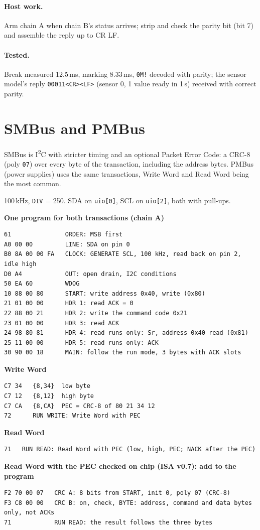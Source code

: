 \documentclass[11pt,a4paper]{article}
\newcommand{\sig}[1]{\texttt{#1}}
\newcommand{\progtitle}[1]{\par\smallskip\textbf{\small\color{accent}#1}\par\nopagebreak}
\newcommand{\facts}[1]{\par\noindent\colorbox{codebg}{\parbox{\dimexpr\linewidth-2\fboxsep}{\small #1}}\par}
\begin{document}
\paragraph{Host work.} Arm chain A when chain B's status arrives; strip and check the parity bit (bit 7) and assemble the reply up to CR LF.

\paragraph{Tested.} Break measured 12.5\,ms, marking 8.33\,ms, \texttt{0M!} decoded with parity; the sensor model's reply \texttt{00011<CR><LF>} (sensor 0, 1 value ready in 1\,s) received with correct parity.
\section{SMBus and PMBus}
SMBus is I\textsuperscript{2}C with stricter timing and an optional Packet Error Code: a CRC-8 (poly \texttt{07}) over every byte of the transaction, including the address bytes. PMBus (power supplies) uses the same transactions, Write Word and Read Word being the most common.
\facts{100\,kHz, \sig{DIV} = 250. SDA on \sig{uio[0]}, SCL on \sig{uio[2]}, both with pull-ups.}
\progtitle{One program for both transactions (chain A)}
\begin{lstlisting}
61               ORDER: MSB first
A0 00 00         LINE: SDA on pin 0
B0 8A 00 00 FA   CLOCK: GENERATE SCL, 100 kHz, read back on pin 2, idle high
D0 A4            OUT: open drain, I2C conditions
50 EA 60         WDOG
10 88 00 80      START: write address 0x40, write (0x80)
21 01 00 00      HDR 1: read ACK = 0
22 88 00 21      HDR 2: write the command code 0x21
23 01 00 00      HDR 3: read ACK
24 98 80 81      HDR 4: read runs only: Sr, address 0x40 read (0x81)
25 11 00 00      HDR 5: read runs only: ACK
30 90 00 18      MAIN: follow the run mode, 3 bytes with ACK slots
\end{lstlisting}
\progtitle{Write Word}
\begin{lstlisting}
C7 34   {8,34}  low byte
C7 12   {8,12}  high byte
C7 CA   {8,CA}  PEC = CRC-8 of 80 21 34 12
72      RUN WRITE: Write Word with PEC
\end{lstlisting}
\progtitle{Read Word}
\begin{lstlisting}
71   RUN READ: Read Word with PEC (low, high, PEC; NACK after the PEC)
\end{lstlisting}
\progtitle{Read Word with the PEC checked on chip (ISA v0.7): add to the program}
\begin{lstlisting}
F2 70 00 07   CRC A: 8 bits from START, init 0, poly 07 (CRC-8)
F3 C8 00 00   CRC B: on, check, BYTE: address, command and data bytes only, not ACKs
71            RUN READ: the result follows the three bytes
\end{lstlisting}
\end{document}
